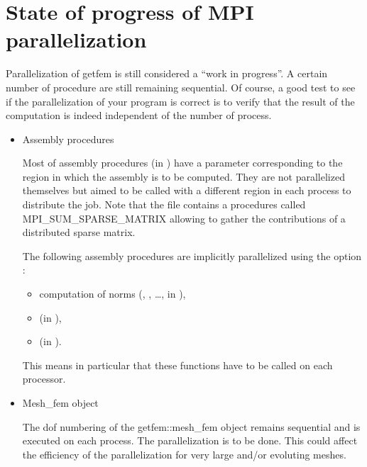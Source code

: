 \documentclass[a4paper,11pt,english]{sphinxmanual}
\begin{document}
\section{State of progress of  MPI parallelization}
\label{\detokenize{userdoc/parallel:state-of-progress-of-gf-mpi-parallelization}}
Parallelization of getfem is still considered a “work in progress”. A certain number of procedure are still remaining sequential. Of course, a good test to see if the parallelization of your program is correct is to verify that the result of the computation is indeed independent of the number of process.
\begin{itemize}
\item {} 
Assembly procedures

Most of assembly procedures (in ) have a parameter corresponding to the region in which the assembly is to be computed. They are not parallelized themselves but aimed to be called with a different region in each process to distribute the job. Note that the file  contains a procedures called MPI\_SUM\_SPARSE\_MATRIX allowing to gather the contributions of a distributed sparse matrix.

The following assembly procedures are implicitly parallelized using the option :
\begin{itemize}
\item {} 
computation of norms (, ,  …, in ),

\item {} 
 (in ),

\item {} 
 (in ).

\end{itemize}

This means in particular that these functions have to be called on each
processor.

\item {} 
Mesh\_fem object

The dof numbering of the getfem::mesh\_fem object remains sequential and is executed on each process.  The parallelization is to be done. This could affect the efficiency of the parallelization for very large and/or evoluting meshes.


\end{itemize}
\end{document}
